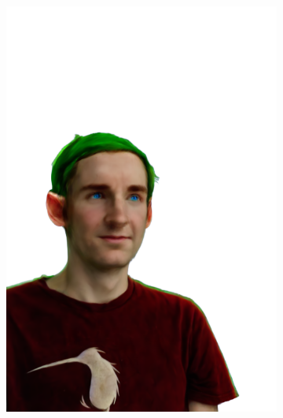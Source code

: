 \begin{figure}[ht]
\begin{subfigure}{0.08\linewidth}
        \includegraphics[width=\textwidth]{Figures/results/low/simon_elf/11_render.png}
	\end{subfigure}
    \begin{subfigure}{0.08\linewidth}%

\end{subfigure}
\end{figure}
